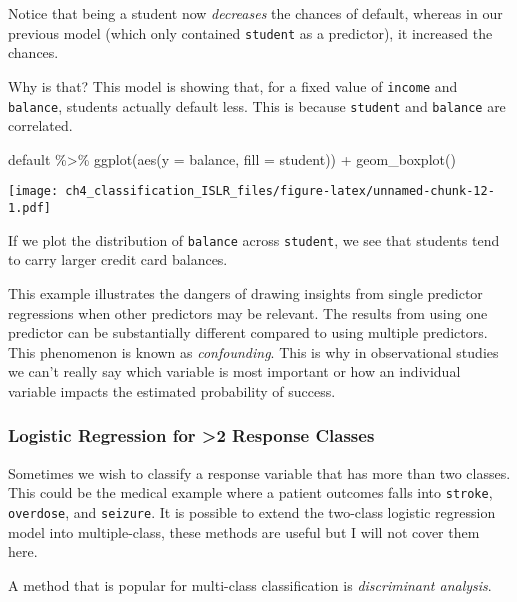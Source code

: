 \documentclass[
]{article}
\newenvironment{Shaded}{\begin{snugshade}}{\end{snugshade}}
\newcommand{\AttributeTok}[1]{\textcolor[rgb]{0.77,0.63,0.00}{#1}}
\newcommand{\FunctionTok}[1]{\textcolor[rgb]{0.00,0.00,0.00}{#1}}
\newcommand{\NormalTok}[1]{#1}
\newcommand{\SpecialCharTok}[1]{\textcolor[rgb]{0.00,0.00,0.00}{#1}}
\begin{document}
Notice that being a student now \emph{decreases} the chances of default,
whereas in our previous model (which only contained \texttt{student} as
a predictor), it increased the chances.

Why is that? This model is showing that, for a fixed value of
\texttt{income} and \texttt{balance}, students actually default less.
This is because \texttt{student} and \texttt{balance} are correlated.

\begin{Shaded}
\begin{Highlighting}[]
\NormalTok{default }\SpecialCharTok{\%\textgreater{}\%}
  \FunctionTok{ggplot}\NormalTok{(}\FunctionTok{aes}\NormalTok{(}\AttributeTok{y =}\NormalTok{ balance, }\AttributeTok{fill =}\NormalTok{ student)) }\SpecialCharTok{+}
  \FunctionTok{geom\_boxplot}\NormalTok{()}
\end{Highlighting}
\end{Shaded}

\texttt{[image: ch4\_classification\_ISLR\_files/figure-latex/unnamed-chunk-12-1.pdf]}

If we plot the distribution of \texttt{balance} across \texttt{student},
we see that students tend to carry larger credit card balances.

This example illustrates the dangers of drawing insights from single
predictor regressions when other predictors may be relevant. The results
from using one predictor can be substantially different compared to
using multiple predictors. This phenomenon is known as
\emph{confounding}. This is why in observational studies we can't really
say which variable is most important or how an individual variable
impacts the estimated probability of success.

\hypertarget{logistic-regression-for-2-response-classes}{%
\subsubsection{Logistic Regression for \textgreater2 Response
Classes}\label{logistic-regression-for-2-response-classes}}

Sometimes we wish to classify a response variable that has more than two
classes. This could be the medical example where a patient outcomes
falls into \texttt{stroke}, \texttt{overdose}, and \texttt{seizure}. It
is possible to extend the two-class logistic regression model into
multiple-class, these methods are useful but I will not cover them here.

A method that is popular for multi-class classification is
\emph{discriminant analysis}.
\end{document}
